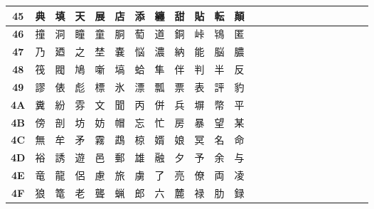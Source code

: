 \begin{table}[H]
{\begin{tabular}{|Sc|Sc|Sc|Sc|Sc|Sc|Sc|Sc|Sc|Sc|Sc|Sc|}
\textbf{45} & 典 & 填 & 天 & 展 & 店 & 添 & 纏 & 甜 & 貼 & 転 & 顛 \\ \hline
\textbf{46} & 撞 & 洞 & 瞳 & 童 & 胴 & 萄 & 道 & 銅 & 峠 & 鴇 & 匿 \\ \hline
\textbf{47} & 乃 & 廼 & 之 & 埜 & 嚢 & 悩 & 濃 & 納 & 能 & 脳 & 膿 \\ \hline
\textbf{48} & 筏 & 閥 & 鳩 & 噺 & 塙 & 蛤 & 隼 & 伴 & 判 & 半 & 反 \\ \hline
\textbf{49} & 謬 & 俵 & 彪 & 標 & 氷 & 漂 & 瓢 & 票 & 表 & 評 & 豹 \\ \hline
\textbf{4A} & 糞 & 紛 & 雰 & 文 & 聞 & 丙 & 併 & 兵 & 塀 & 幣 & 平 \\ \hline
\textbf{4B} & 傍 & 剖 & 坊 & 妨 & 帽 & 忘 & 忙 & 房 & 暴 & 望 & 某 \\ \hline
\textbf{4C} & 無 & 牟 & 矛 & 霧 & 鵡 & 椋 & 婿 & 娘 & 冥 & 名 & 命 \\ \hline
\textbf{4D} & 裕 & 誘 & 遊 & 邑 & 郵 & 雄 & 融 & 夕 & 予 & 余 & 与 \\ \hline
\textbf{4E} & 竜 & 龍 & 侶 & 慮 & 旅 & 虜 & 了 & 亮 & 僚 & 両 & 凌 \\ \hline
\textbf{4F} & 狼 & 篭 & 老 & 聾 & 蝋 & 郎 & 六 & 麓 & 禄 & 肋 & 録 \\ \hline
\end{tabular}
}
\end{table}

